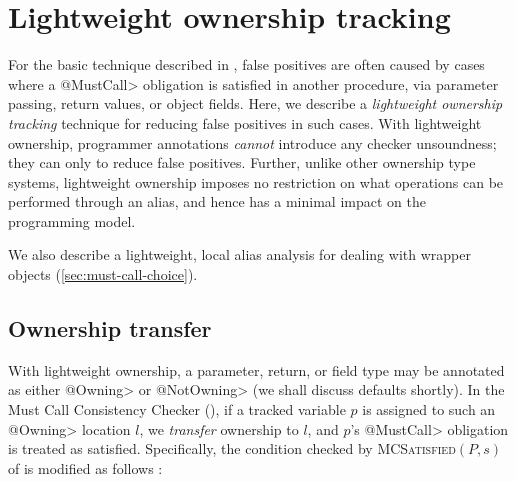 \section{Lightweight ownership tracking}
\label{sec:lightweight-ownership}

For the basic technique described in , false
positives are often caused by cases where a \<@MustCall> obligation is satisfied
in another procedure, via parameter passing, return values, or object fields.
Here, we describe a \emph{lightweight ownership tracking} technique for reducing
false positives in such cases.  With lightweight ownership, programmer
annotations \emph{cannot} introduce any checker unsoundness; they can only to
reduce false positives.  Further, unlike other ownership type systems,
lightweight ownership imposes no restriction on what operations can be performed
through an alias, and hence has a minimal impact on the programming model.


We also describe a lightweight, local alias analysis for dealing with wrapper
objects (\cref{sec:must-call-choice}).

\subsection{Ownership transfer}
\label{sec:ownership-transfer}


With lightweight ownership, a parameter, return, or field type may be annotated
as either \<@Owning> or \<@NotOwning> (we shall discuss defaults shortly).  In
the Must Call Consistency Checker (), if a tracked
variable $p$ is assigned to such an \<@Owning> location $l$, we \emph{transfer}
ownership to $l$, and $p$'s \<@MustCall> obligation
is treated as satisfied. Specifically, the condition checked by
\textsc{MCSatisfied}$(P,s)$ of  is modified as follows
:

